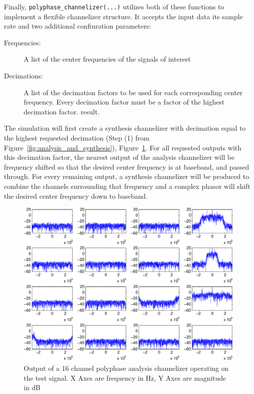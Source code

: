 \documentclass[12pt]{report}
\begin{document}
Finally, \texttt{polyphase\_channelizer(...)} utilizes both of these functions to
implement a flexible channelizer structure.  It accepts the input data its
sample rate and two additional confiuration parameters:
\begin{description}
    \item[Frequencies:] A list of the center frequencies of the signals of interest
    \item[Decimations:] A list of the decimation factors to be used for each
        corresponding center frequency.  Every decimation factor must be
        a factor of the highest decimation factor.
    result.
\end{description}
The simulation will first create a synthesis channelizer with decimation equal
to the highest requested decimation (Step (1) from
Figure~\ref{fig:analysis_and_synthesis}), Figure~\ref{fig:polyphase_splits}.  For
all requested outputs with this decimation factor, the nearest output of the
analysis channelizer will be frequency shifted so that the desired center
frequency is at baseband, and passed through. For every remaining output,
a synthesis channelizer will be produced to combine the channels surrounding
that frequency and a complex phasor will shift the desired center frequency
down to baseband.

\begin{figure}[bh!]
    \includegraphics[width=\textwidth]{polyphase_splits}%
    \caption{Output of a 16 channel polyphase analysis channelizer operating on
             the test signal. X Axes are frequency in Hz, Y Axes are magnitude
             in dB}
    \label{fig:polyphase_splits}
\end{figure}
\end{document}
